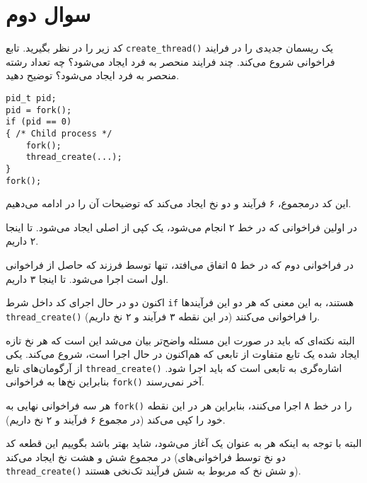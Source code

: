 
\section{سوال دوم}

کد زیر را در نظر بگیرید. تابع \texttt{create\_thread()} یک ریسمان جدیدی را در فرایند فراخوانی شروع می‌کند. چند فرایند منحصر به فرد ایجاد می‌شود؟ چه تعداد رشته منحصر به فرد ایجاد می‌شود؟ توضیح دهید.


\begin{latin}
\begin{lstlisting}[caption=Code of Q2, label=cpp_code_example]
pid_t pid;
pid = fork();
if (pid == 0) 
{ /* Child process */
	fork();
	thread_create(...);
}
fork();

\end{lstlisting}
\end{latin}


\begin{qsolve}
	این کد درمجموع، ۶ فرآیند و دو نخ ایجاد می‌کند که توضیحات آن را در ادامه می‌دهیم.
	
	در اولین فراخوانی  که در خط ۲ انجام می‌شود، یک کپی از  اصلی ایجاد می‌شود. تا اینجا ۲  داریم.
	
	در فراخوانی دوم که در خط ۵ اتفاق می‌افتد، تنها توسط  فرزند که حاصل از فراخوانی اول است اجرا می‌شود. تا اینجا ۳  داریم.
	
	اکنون دو  در حال اجرای کد داخل شرط \texttt{if} هستند، به این معنی که هر دو این فرآیندها \texttt{thread\_create()} را فراخوانی می‌کنند (در این نقطه ۳ فرآیند و ۲ نخ داریم).
	
	البته نکته‌ای که باید در صورت این مسئله واضح‌تر بیان می‌شد این است که هر نخ تازه ایجاد شده یک تابع متفاوت از تابعی که هم‌اکنون در حال اجرا است، شروع می‌کند. یکی از آرگومان‌های تابع \texttt{thread\_create()} اشاره‌گری به تابعی است که باید اجرا شود. بنابراین نخ‌ها به فراخوانی \texttt{fork()} آخر نمی‌رسند.
	
	هر سه  فراخوانی نهایی به \texttt{fork()} را در خط ۸ اجرا می‌کنند، بنابراین هر  در این نقطه خود را کپی می‌کند (در مجموع ۶ فرآیند و ۲ نخ داریم).
	
	
	البته با توجه به اینکه هر  به عنوان یک  آغاز می‌شود، شاید بهتر باشد بگوییم این قطعه کد در مجموع شش  و هشت نخ ایجاد می‌کند (دو نخ توسط فراخوانی‌های \texttt{thread\_create()} و شش نخ که مربوط به شش فرآیند تک‌نخی هستند).
	
\end{qsolve}